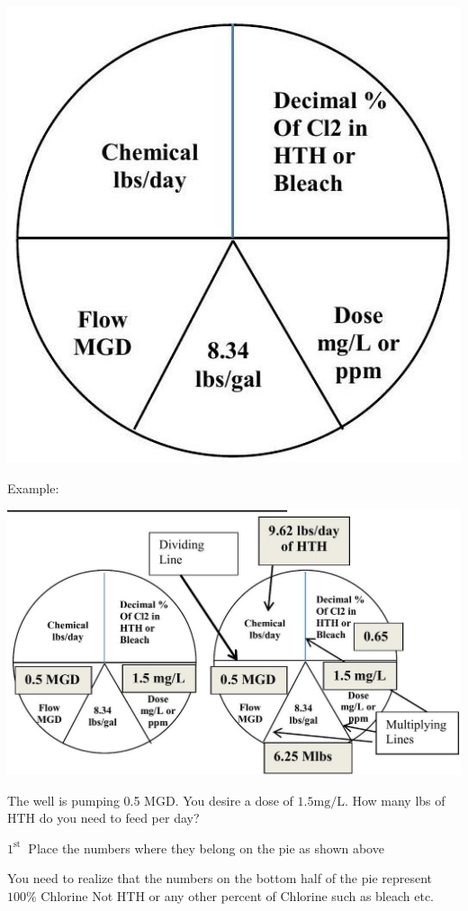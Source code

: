 \documentclass[10pt]{article}
\begin{document}
\includegraphics[max width=\textwidth]{2022_09_16_0c6b804a9b26a8df4e8fg-11}

Example:

\includegraphics[max width=\textwidth]{2022_09_16_0c6b804a9b26a8df4e8fg-11(1)}

The well is pumping 0.5 MGD. You desire a dose of $1.5 \mathrm{mg} / \mathrm{L}$. How many lbs of $\mathrm{HTH}$ do you need to feed per day?

$1^{\text {st }}$ Place the numbers where they belong on the pie as shown above

You need to realize that the numbers on the bottom half of the pie represent $100 \%$ Chlorine Not $\mathrm{HTH}$ or any other percent of Chlorine such as bleach etc.
\end{document}
